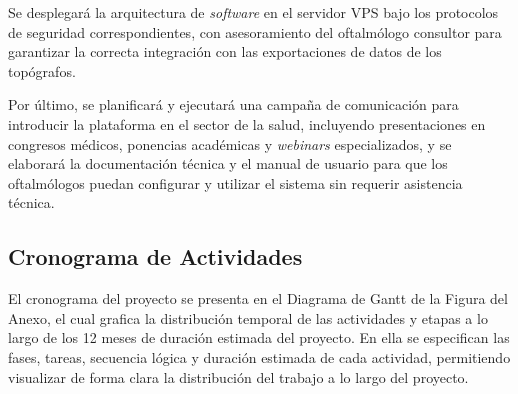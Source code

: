         Se desplegará la arquitectura de \textit{software} en el servidor VPS bajo los protocolos de seguridad correspondientes, con asesoramiento del oftalmólogo consultor para garantizar la correcta integración con las exportaciones de datos de los topógrafos. 
        
        Por último, se planificará y ejecutará una campaña de comunicación para introducir la plataforma en el sector de la salud, incluyendo presentaciones en congresos médicos, ponencias académicas y \textit{webinars} especializados, y se elaborará la documentación técnica y el manual de usuario para que los oftalmólogos puedan configurar y utilizar el sistema sin requerir asistencia técnica.

    \vspace{0.25 cm}
    \subsection{Cronograma de Actividades}

        El cronograma del proyecto se presenta en el Diagrama de Gantt de la Figura del Anexo, el cual grafica la distribución temporal de las actividades y etapas a lo largo de los 12 meses de duración estimada del proyecto. En ella se especifican las fases, tareas, secuencia lógica y duración estimada de cada actividad, permitiendo visualizar de forma clara la distribución del trabajo a lo largo del proyecto.